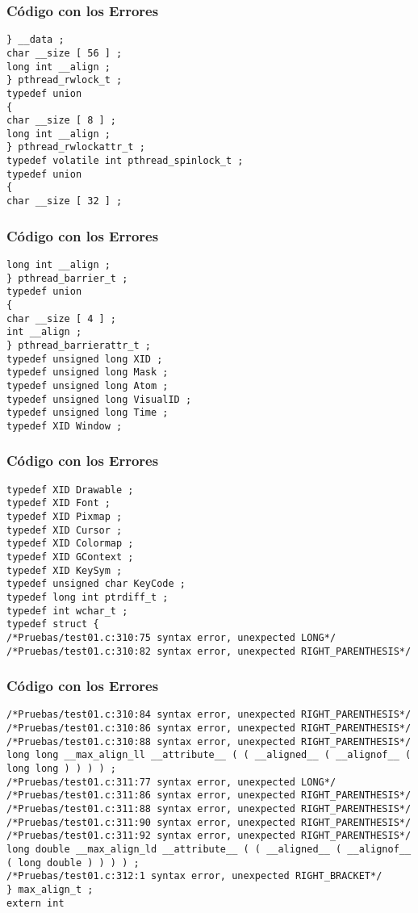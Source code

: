 \documentclass{beamer}
\begin{document}
\begin{frame}[fragile]
\frametitle{C\'odigo con los Errores}
\begin{verbatim}
} __data ; 
char __size [ 56 ] ; 
long int __align ; 
} pthread_rwlock_t ; 
typedef union 
{ 
char __size [ 8 ] ; 
long int __align ; 
} pthread_rwlockattr_t ; 
typedef volatile int pthread_spinlock_t ; 
typedef union 
{ 
char __size [ 32 ] ; 
\end{verbatim}
\end{frame}
\begin{frame}[fragile]
\frametitle{C\'odigo con los Errores}
\begin{verbatim}
long int __align ; 
} pthread_barrier_t ; 
typedef union 
{ 
char __size [ 4 ] ; 
int __align ; 
} pthread_barrierattr_t ; 
typedef unsigned long XID ; 
typedef unsigned long Mask ; 
typedef unsigned long Atom ; 
typedef unsigned long VisualID ; 
typedef unsigned long Time ; 
typedef XID Window ; 
\end{verbatim}
\end{frame}
\begin{frame}[fragile]
\frametitle{C\'odigo con los Errores}
\begin{verbatim}
typedef XID Drawable ; 
typedef XID Font ; 
typedef XID Pixmap ; 
typedef XID Cursor ; 
typedef XID Colormap ; 
typedef XID GContext ; 
typedef XID KeySym ; 
typedef unsigned char KeyCode ; 
typedef long int ptrdiff_t ; 
typedef int wchar_t ; 
typedef struct { 
/*Pruebas/test01.c:310:75 syntax error, unexpected LONG*/
/*Pruebas/test01.c:310:82 syntax error, unexpected RIGHT_PARENTHESIS*/
\end{verbatim}
\end{frame}
\begin{frame}[fragile]
\frametitle{C\'odigo con los Errores}
\begin{verbatim}
/*Pruebas/test01.c:310:84 syntax error, unexpected RIGHT_PARENTHESIS*/
/*Pruebas/test01.c:310:86 syntax error, unexpected RIGHT_PARENTHESIS*/
/*Pruebas/test01.c:310:88 syntax error, unexpected RIGHT_PARENTHESIS*/
long long __max_align_ll __attribute__ ( ( __aligned__ ( __alignof__ ( long long ) ) ) ) ; 
/*Pruebas/test01.c:311:77 syntax error, unexpected LONG*/
/*Pruebas/test01.c:311:86 syntax error, unexpected RIGHT_PARENTHESIS*/
/*Pruebas/test01.c:311:88 syntax error, unexpected RIGHT_PARENTHESIS*/
/*Pruebas/test01.c:311:90 syntax error, unexpected RIGHT_PARENTHESIS*/
/*Pruebas/test01.c:311:92 syntax error, unexpected RIGHT_PARENTHESIS*/
long double __max_align_ld __attribute__ ( ( __aligned__ ( __alignof__ ( long double ) ) ) ) ; 
/*Pruebas/test01.c:312:1 syntax error, unexpected RIGHT_BRACKET*/
} max_align_t ; 
extern int 
\end{verbatim}
\end{frame}
\end{document}
